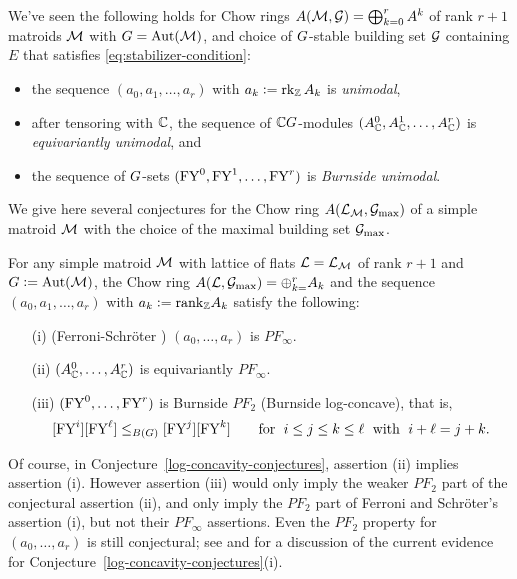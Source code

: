 \begin{example} \rm
\label{unimodality-of-various-kinds-example}
We've seen the following holds for Chow rings $A(\mathcal{M}, \mathcal{G})=\bigoplus_{k=0}^r A^k$ of rank $r+1$ matroids $\mathcal{M}$ with $G=\operatorname{\mathrm{Aut}}(\mathcal{M})$, and choice of $G$-stable building set $\mathcal{G}$ containing $E$ that satisfies \eqref{eq:stabilizer-condition}:
\begin{itemize}
    \item 
the sequence $(a_0,a_1,\ldots,a_r)$ with $a_k:=\operatorname{\mathrm{rk}}_{\mathbb{Z}} A_k$ is {\it unimodal}, 
\item after tensoring with $\mathbb{C}$, the sequence of $\mathbb{C} G$-modules $(A^0_{\mathbb{C}},A^1_{\mathbb{C}},\ldots,A^r_{\mathbb{C}})$ is {\it equivariantly unimodal}, and
\item the sequence of $G$-sets $(\mathrm{FY}^0,\mathrm{FY}^1,\ldots,\mathrm{FY}^r)$
is {\it Burnside unimodal}.
\end{itemize}
\end{example}


 We give here several conjectures for the Chow ring $A(\mathcal{L}_{\mathcal{M}},\mathcal{G}_{\max})$ of a simple matroid $\mathcal{M}$ with the choice of the maximal building set $\mathcal{G}_{\max}$. 


 
\begin{conj}
\label{log-concavity-conjectures}
For any simple matroid $\mathcal{M}$ with lattice of flats $\mathcal{L}=\mathcal{L}_{\mathcal{M}}$ of rank $r+1$ and $G:=\operatorname{\mathrm{Aut}}(\mathcal{M})$, the Chow ring $A(\mathcal{L},\mathcal{G}_{\max})=\oplus_{k=}^r A_k$
and the sequence $(a_0,a_1,\ldots,a_r)$ with $a_k:=\mathrm{rank}_{\mathbb{Z}} A_k$
satisfy the following:
    \begin{itemize}
    \item[(i)] (Ferroni-Schr\"oter \cite[Conj. 10.19]{FerroniSchroter}) $(a_0,\ldots,a_r)$ is $PF_\infty$.
\item[(ii)] $(A^0_{\mathbb{C}},\ldots,A^r_{\mathbb{C}})$ is equivariantly $PF_\infty$.
\item[(iii)] $(\mathrm{FY}^0,\ldots,\mathrm{FY}^r)$
is Burnside $PF_2$ (Burnside log-concave), that is,
\[
[\mathrm{FY}^i][\mathrm{FY}^\ell] \leq_{B(G)}
[\mathrm{FY}^j][\mathrm{FY}^k]
\qquad \text{for } 
 \; i \leq j \leq k \leq \ell \; \text{ with } \; i+\ell=j+k.\]
\end{itemize}
\end{conj}
Of course, in Conjecture~\ref{log-concavity-conjectures}, 
assertion (ii) implies assertion (i).
However assertion (iii) would only imply the weaker $PF_2$ part of 
the conjectural assertion (ii), and only imply the $PF_2$ part of Ferroni and Schr\"oter's assertion (i), but not their $PF_\infty$ assertions. Even the $PF_2$ property for $(a_0,\ldots,a_r)$ is still conjectural; see \cite[\S10.3]{FerroniSchroter} and \cite[\S 3.7]{FMSV} for a discussion 
of the current evidence for Conjecture~\ref{log-concavity-conjectures}(i).

